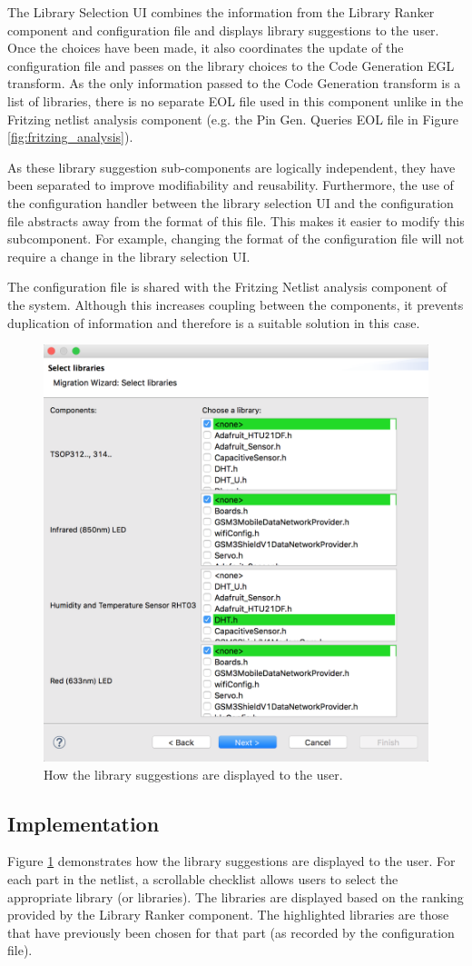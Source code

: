 \documentclass{UoYCSproject}
\begin{document}
The Library Selection UI combines the information from the Library Ranker component and configuration file and displays library suggestions to the user. Once the choices have been made, it also coordinates the update of the configuration file and passes on the library choices to the Code Generation EGL transform. As the only information passed to the Code Generation transform is a list of libraries, there is no separate EOL file used in this component unlike in the Fritzing netlist analysis component (e.g. the Pin Gen. Queries EOL file in Figure \ref{fig:fritzing_analysis}).

As these library suggestion sub-components are logically independent, they have been separated to improve modifiability and reusability. Furthermore, the use of the configuration handler between the library selection UI and the configuration file abstracts away from the format of this file. This makes it easier to modify this subcomponent. For example, changing the format of the configuration file will not require a change in the library selection UI.

The configuration file is shared with the Fritzing Netlist analysis component of the system. Although this increases coupling between the components, it prevents duplication of information and therefore is a suitable solution in this case.

\begin{figure}[h!]
  \centering
  \includegraphics[width=0.6\linewidth]{graphics/lib_selection_ui.png}
  \caption{How the library suggestions are displayed to the user.}
  \label{fig:lib_selection_ui}
\end{figure}

\subsection{Implementation}
Figure \ref{fig:lib_selection_ui} demonstrates how the library suggestions are displayed to the user. For each part in the netlist, a scrollable checklist allows users to select the appropriate library (or libraries). The libraries are displayed based on the ranking provided by the Library Ranker component. The highlighted libraries are those that have previously been chosen for that part (as recorded by the configuration file).
\end{document}
